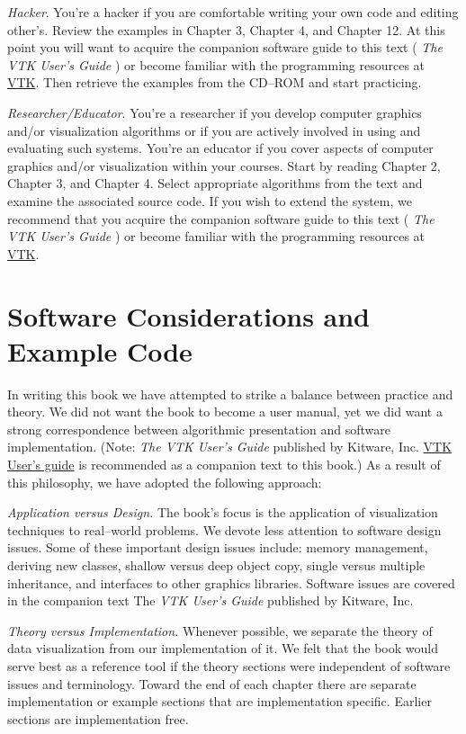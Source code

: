 \emph{Hacker}. You're a hacker if you are comfortable writing your own code and editing other's. Review the examples in Chapter 3, Chapter 4, and Chapter 12. At this point you will want to acquire the companion software guide to this text ( \emph{The VTK User's Guide} ) or become familiar with the programming resources at \href{https://www.vtk.org/}{VTK}. Then retrieve the examples from the CD--ROM and start practicing.

\emph{Researcher/Educator}. You're a researcher if you develop computer graphics and/or visualization algorithms or if you are actively involved in using and evaluating such systems. You're an educator if you cover aspects of computer graphics and/or visualization within your courses. Start by reading Chapter 2, Chapter 3, and Chapter 4. Select appropriate algorithms from the text and examine the associated source code. If you wish to extend the system, we recommend that you acquire the companion software guide to this text ( \emph{The VTK User's Guide} ) or become familiar with the programming resources at \href{https://www.vtk.org/}{VTK}.

\section{Software Considerations and Example Code}

In writing this book we have attempted to strike a balance between practice and theory. We did not want the book to become a user manual, yet we did want a strong correspondence between algorithmic presentation and software implementation. (Note: \emph{The VTK User's Guide} published by Kitware, Inc. \href{https://www.vtk.org/vtk-users-guide/}{VTK User's guide} is recommended as a companion text to this book.) As a result of this philosophy, we have adopted the following approach:

\emph{Application versus Design.} The book's focus is the application of visualization techniques to real--world problems. We devote less attention to software design issues. Some of these important design issues include: memory management, deriving new classes, shallow versus deep object copy, single versus multiple inheritance, and interfaces to other graphics libraries. Software issues are covered in the companion text The \emph{VTK User's Guide} published by Kitware, Inc.

\textit{Theory versus Implementation.} Whenever possible, we separate the theory of data visualization from our implementation of it. We felt that the book would serve best as a reference tool if the theory sections were independent of software issues and terminology. Toward the end of each chapter there are separate implementation or example sections that are implementation specific. Earlier sections are implementation free.

